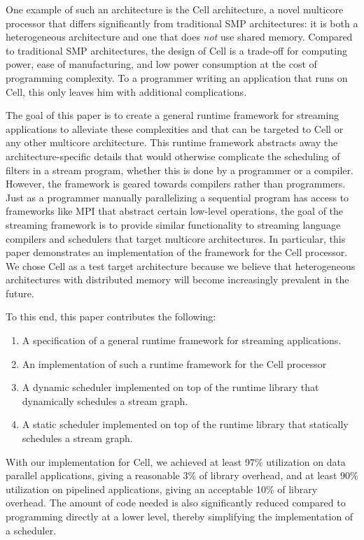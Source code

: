 One example of such an architecture is the Cell architecture, a novel multicore processor that differs significantly from traditional SMP architectures: it is both a heterogeneous architecture and one that does \emph{not} use shared memory. Compared to traditional SMP architectures, the design of Cell is a trade-off for computing power, ease of manufacturing, and low power consumption at the cost of programming complexity. To a programmer writing an application that runs on Cell, this only leaves him with additional complications.

The goal of this paper is to create a general runtime framework for streaming applications to alleviate these complexities and that can be targeted to Cell or any other multicore architecture. This runtime framework abstracts away the architecture-specific details that would otherwise complicate the scheduling of filters in a stream program, whether this is done by a programmer or a compiler. However, the framework is geared towards compilers rather than programmers. Just as a programmer manually parallelizing a sequential program has access to frameworks like MPI that abstract certain low-level operations, the goal of the streaming framework is to provide similar functionality to streaming language compilers and schedulers that target multicore architectures. In particular, this paper demonstrates an implementation of the framework for the Cell processor. We chose Cell as a test target architecture because we believe that heterogeneous architectures with distributed memory will become increasingly prevalent in the future.

To this end, this paper contributes the following:
\begin{enumerate}
\item A specification of a general runtime framework for streaming applications.
\item An implementation of such a runtime framework for the Cell processor
\item A dynamic scheduler implemented on top of the runtime library that dynamically schedules a stream graph.
\item A static scheduler implemented on top of the runtime library that statically schedules a stream graph.
\end{enumerate}

With our implementation for Cell, we achieved at least 97\% utilization on data parallel applications, giving a reasonable 3\% of library overhead, and at least 90\% utilization on pipelined applications, giving an acceptable 10\% of library overhead. The amount of code needed is also significantly reduced compared to programming directly at a lower level, thereby simplifying the implementation of a scheduler.

